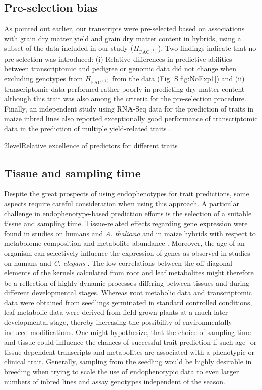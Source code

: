 \documentclass[12pt,titlepage]{article}
\begin{document}
\subsection{Pre-selection bias}
As pointed out earlier, our transcripts were pre-selected based on associations
with grain dry matter yield and grain dry matter content in hybrids, using a 
subset of the data included in our study ($H_{\text{FAC}^{(1)}}$).
Two findings indicate that no pre-selection was introduced:
(i) Relative differences in predictive abilities between transcriptomic and
pedigree or genomic data did not change when excluding genotypes from 
$H_{\text{FAC}^{(1)}}$ from the data (Fig. S\ref{fig:NoExp1}) and 
(ii) transcriptomic data performed rather poorly in predicting dry matter 
content although this trait was also among the criteria for the pre-selection 
procedure.
Finally, an independent study using RNA-Seq data for the prediction of traits
in maize inbred lines also reported exceptionally good performance of 
transcriptomic data in the prediction of multiple yield-related traits 
\cite{Guo2016}.


 

\Genetics2level{Relative excellence of predictors for different traits}
\subsection{Tissue and sampling time}
Despite the great prospects of using endophenotypes for trait predictions, some
aspects require careful consideration when using this approach.
A particular challenge in endophenotype-based prediction efforts is the selection
of a suitable tissue and sampling time.
Tissue-related effects regarding gene expression were found in studies on humans 
\cite{Yang2015,Mele2015,Searle2016} and \textit{A. thaliana} \cite{Schmid2005}
and in maize hybrids with respect to metabolome composition and metabolite 
abundance \cite{Witt2012}.
Moreover, the age of an organism can selectively influence the expression of 
genes as observed in studies on humans \cite{Mele2015,Yang2015} and 
\textit{C. elegans} \cite{Vinuela2010,Francesconi2014}.
The low correlations between the off-diagonal elements of the kernels calculated 
from root and leaf metabolites might therefore be a reflection of highly dynamic 
processes differing between tissues and during different developmental stages.
Whereas root metabolic data and transcriptomic data were obtained from
seedlings germinated in standard controlled conditions, leaf metabolic data were
derived from field-grown plants at a much later developmental stage, thereby
increasing the possibility of environmentally-induced modifications.
One might hypothesize, that the choice of sampling time and tissue could
influence the chances of successful trait prediction if such age- or 
tissue-dependent transcripts and metabolites are associated with a phenotypic 
or clinical trait.
Generally, sampling from the seedling would be highly desirable in breeding when 
trying to scale the use of endophenotypic data to even larger numbers of inbred 
lines and assay genotypes independent of the season.
\end{document}
